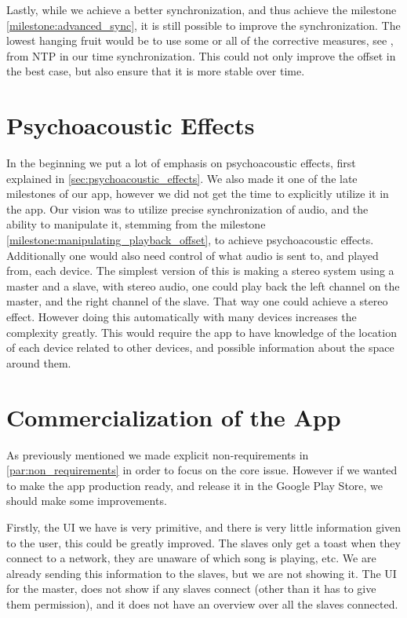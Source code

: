 Lastly, while we achieve a better synchronization, and thus achieve the milestone \ref{milestone:advanced_sync}, it is still possible to improve the synchronization.
The lowest hanging fruit would be to use some or all of the corrective measures, see , from \ac{NTP} in our time synchronization.
This could not only improve the offset in the best case, but also ensure that it is more stable over time.

\section{Psychoacoustic Effects}
In the beginning we put a lot of emphasis on psychoacoustic effects, first explained in \cref{sec:psychoacoustic_effects}.
We also made it one of the late milestones of our app, however we did not get the time to explicitly utilize it in the app.
Our vision was to utilize precise synchronization of audio, and the ability to manipulate it, stemming from the milestone \ref{milestone:manipulating_playback_offset}, to achieve psychoacoustic effects.
Additionally one would also need control of what audio is sent to, and played from, each device.
The simplest version of this is making a stereo system using a master and a slave, with stereo audio, one could play back the left channel on the master, and the right channel of the slave.
That way one could achieve a stereo effect.
However doing this automatically with many devices increases the complexity greatly.
This would require the app to have knowledge of the location of each device related to other devices, and possible information about the space around them.

\section{Commercialization of the App}
As previously mentioned we made explicit non-requirements in \cref{par:non_requirements} in order to focus on the core issue.
However if we wanted to make the app production ready, and release it in the Google Play Store, we should make some improvements.

Firstly, the UI we have is very primitive, and there is very little information given to the user, this could be greatly improved.
The slaves only get a toast when they connect to a network, they are unaware of which song is playing, etc.
We are already sending this information to the slaves, but we are not showing it.
The UI for the master, does not show if any slaves connect (other than it has to give them permission), and it does not have an overview over all the slaves connected.

